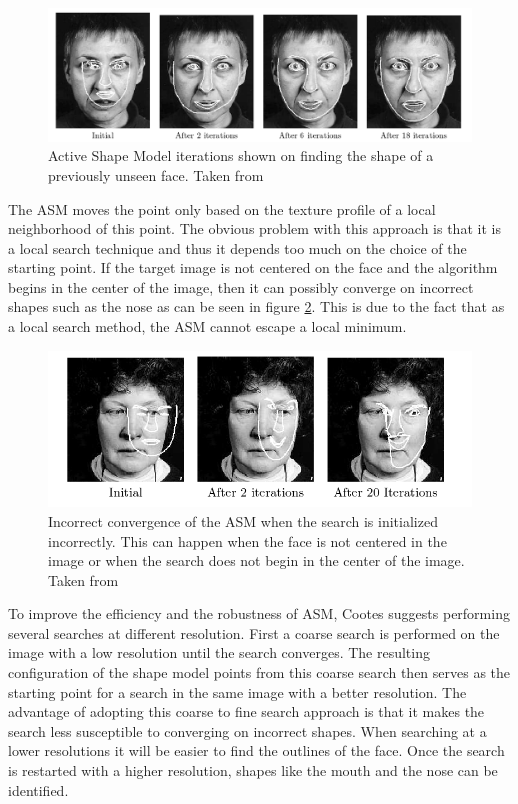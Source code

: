 \documentclass[11pt,a4paper]{report}
\begin{document}
\begin{figure}[H]
\centering
\includegraphics[scale=0.5]{images/scary_face2.png}
\caption{ Active Shape Model iterations shown on finding the shape of a
  previously unseen face. Taken from \cite{cootesOverview01} }
\label{gr:asm}
\end{figure}

The ASM moves the point only based on the texture profile of a
local neighborhood of this point. The obvious problem with this approach is
that it is a local search technique and thus it depends too much on the choice of the
starting point. If the target image is not centered on the face and the
algorithm begins in the center of the image, then it can possibly converge on incorrect
shapes such as the nose as can be seen in figure \ref{gr:bad_asm}. This is due to
the fact that as a local search method, the ASM cannot escape a local minimum.

\begin{figure}[H]
\centering
\includegraphics[scale=0.7]{images/bad_asm.png}
\caption{ Incorrect convergence of the ASM when the search is initialized
  incorrectly. This can happen when the face is not centered in the image or
  when the search does not begin in the center of the image. Taken from \cite{cootesOverview01} }
\label{gr:bad_asm}
\end{figure}

To improve the efficiency and the robustness of ASM, Cootes
suggests performing several searches at different resolution. First a coarse
search is performed on the image with a low resolution until the search converges. The resulting configuration
of the shape model points from this coarse search
then serves as the starting point for a search in the same image with a better
resolution. The advantage of adopting this coarse to fine search approach is
that it makes the search less susceptible to converging on incorrect shapes. When
searching at a lower resolutions it will be easier to find the outlines of the
face. Once the search is restarted with a higher resolution, shapes like the
mouth and the nose can be identified.
\end{document}
